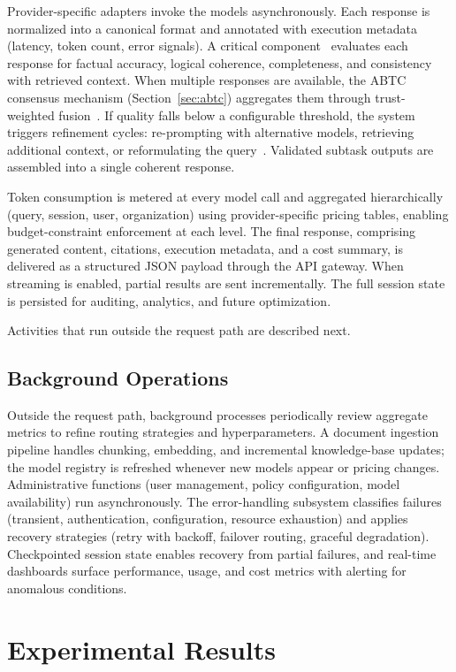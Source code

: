 \documentclass{iopjournal}
\begin{document}
Provider-specific adapters invoke the models asynchronously. Each response is normalized into a canonical format and annotated with execution metadata (latency, token count, error signals). A critical component~\cite{Reflexion} evaluates each response for factual accuracy, logical coherence, completeness, and consistency with retrieved context. When multiple responses are available, the ABTC consensus mechanism (Section~\ref{sec:abtc}) aggregates them through trust-weighted fusion~\cite{MACollab}. If quality falls below a configurable threshold, the system triggers refinement cycles: re-prompting with alternative models, retrieving additional context, or reformulating the query~\cite{SelfRefine}. Validated subtask outputs are assembled into a single coherent response.

Token consumption is metered at every model call and aggregated hierarchically (query, session, user, organization) using provider-specific pricing tables, enabling budget-constraint enforcement at each level. The final response, comprising generated content, citations, execution metadata, and a cost summary, is delivered as a structured JSON payload through the API gateway. When streaming is enabled, partial results are sent incrementally. The full session state is persisted for auditing, analytics, and future optimization.

Activities that run outside the request path are described next.

\subsection{Background Operations}

Outside the request path, background processes periodically review aggregate metrics to refine routing strategies and hyperparameters. A document ingestion pipeline handles chunking, embedding, and incremental knowledge-base updates; the model registry is refreshed whenever new models appear or pricing changes. Administrative functions (user management, policy configuration, model availability) run asynchronously. The error-handling subsystem classifies failures (transient, authentication, configuration, resource exhaustion) and applies recovery strategies (retry with backoff, failover routing, graceful degradation). Checkpointed session state enables recovery from partial failures, and real-time dashboards surface performance, usage, and cost metrics with alerting for anomalous conditions.

\section{Experimental Results}
\label{sec:exp}
\FloatBarrier
\end{document}
